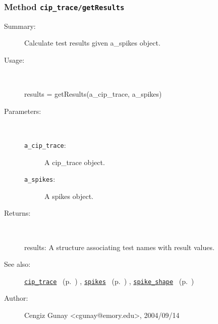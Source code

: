\subsubsection[Method \texttt{getResults}]{Method \texttt{cip\_trace/getResults}}%
%
\label{ref_cip_trace__getResults}%
\hypertarget{ref_cip_trace__getResults}{}%
\begin{description}
\item[Summary:]Calculate test results given a\_spikes object.
%
\item[Usage:]~%
\begin{lyxcode}%
results = getResults(a\_cip\_trace, a\_spikes)
%
\end{lyxcode}%
%
%
\item[Parameters:]~
\begin{description}%
\item[\texttt{a\_cip\_trace}:]
 A cip\_trace object.
\item[\texttt{a\_spikes}:]
 A spikes object.
\end{description}%
%
\item[Returns:
]~

	results: A structure associating test names with result values.
%
%
\item[See also:]%
\hyperlink{ref_cip_trace}{\texttt{cip\_trace}}%
\ (p.~\pageref{ref_cip_trace})%
%
, \hyperlink{ref_spikes}{\texttt{spikes}}%
\ (p.~\pageref{ref_spikes})%
%
, \hyperlink{ref_spike_shape}{\texttt{spike\_shape}}%
\ (p.~\pageref{ref_spike_shape})%
%
%
\item[Author:]%
Cengiz Gunay <cgunay@emory.edu>, 2004/09/14
%
\end{description}
\methodline%
